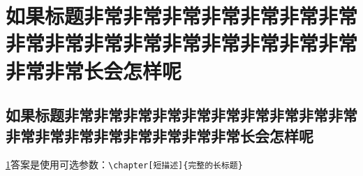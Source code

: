 \usepackage{multirow,tabularray,wrapfig,subcaption}
\usepackage{hologo,blindtext,zhlipsum}




\DeclareMathOperator{\spn}{span}
\renewcommand{\vec}[1]{\mathbf{#1}}
\NewDocumentCommand{}



\maketitle

% 


\raggedbottom

\tableofcontents
\listoffigures
\listoftables

\mainmatter

\chapter[非常长的标题不好看]{如果标题非常非常非常非常非常非常非常非常非常非常非常非常非常非常非常非常非常非常长会怎样呢}
\label{ch:longtitle}
\section[还是用短点的吧]{如果标题非常非常非常非常非常非常非常非常非常非常非常非常非常非常非常非常非常非常长会怎样呢}
\cref{ch:longtitle}答案是使用可选参数：\verb+\chapter[短描述]{完整的长标题}+

